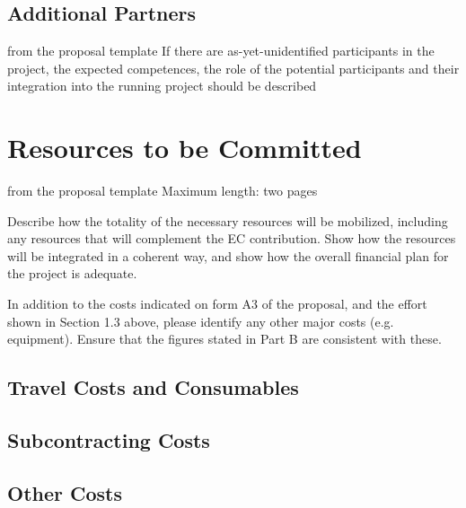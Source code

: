 \subsection{Additional Partners}\label{sec:assoc-partner}
\begin{todo}{from the proposal template}
  If there are as-yet-unidentified participants in the project, the expected competences,
  the role of the potential participants and their integration into the running project
  should be described
\end{todo}

\section{Resources to be Committed}\label{sec:resources}
\begin{todo}{from the proposal template}
Maximum length: two pages

Describe how the totality of the necessary resources will be mobilized, including any resources that
will complement the EC contribution. Show how the resources will be integrated in a coherent way,
and show how the overall financial plan for the project is adequate.

In addition to the costs indicated on form A3 of the proposal, and the effort shown in Section 1.3
above, please identify any other major costs (e.g. equipment). Ensure that the figures stated in Part B
are consistent with these.
\end{todo}

\subsection{Travel Costs and Consumables}\label{sec:travel-costs}
\subsection{Subcontracting Costs}
\subsection{Other Costs}



